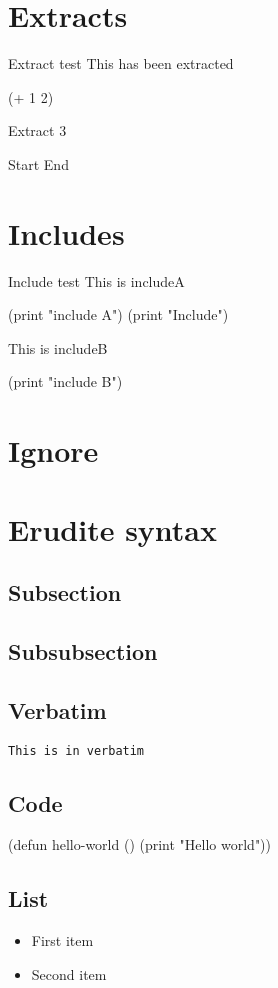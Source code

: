 \documentclass[11pt,pdflatex,makeidx]{scrbook}   %
\begin{document}
\section{Extracts}

Extract test
This has been extracted
\begin{code}
(+ 1 2)
\end{code}

Extract 3

Start
End

\section{Includes}

Include test
This is includeA
\begin{code}
(print "include A")
(print "Include")
\end{code}
This is includeB
\begin{code}
(print "include B")
\end{code}

\section{Ignore}

\section{Erudite syntax}
\subsection{Subsection}
\subsection{Subsubsection}
\subsection{Verbatim}
\begin{verbatim}
This is in verbatim
\end{verbatim}
\subsection{Code}
\begin{code}
(defun hello-world ()
(print "Hello world"))
\end{code}
\subsection{List}
\begin{itemize}
\item First item
\item Second item
\end{itemize}
\end{document}
